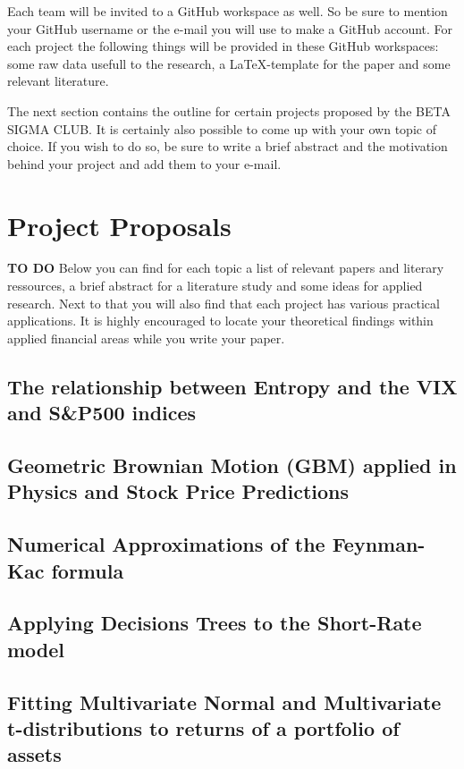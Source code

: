 \documentclass[11pt]{article}
\begin{document}
Each team will be invited to a GitHub workspace as well. So be sure to mention your GitHub username or the e-mail you will use to make a GitHub account. For each project the following things will be provided in these GitHub workspaces: some raw data usefull to the research, a \LaTeX-template for the paper and some relevant literature.

The next section contains the outline for certain projects proposed by the BETA SIGMA CLUB. It is certainly also possible to come up with your own topic of choice. If you wish to do so, be sure to write a brief abstract and the motivation behind your project and add them to your e-mail.

\section{Project Proposals}
\textbf{TO DO} Below you can find for each topic a list of relevant papers and literary ressources, a brief abstract for a literature study and some ideas for applied research. Next to that you will also find that each project has various practical applications. It is highly encouraged to locate your theoretical findings within applied financial areas while you write your paper.


\subsection{The relationship between Entropy and the VIX and S\&P500 indices}

\subsection{Geometric Brownian Motion (GBM) applied in Physics and Stock Price Predictions}

\subsection{Numerical Approximations of the Feynman-Kac formula}

\subsection{Applying Decisions Trees to the Short-Rate model}

\subsection{Fitting Multivariate Normal and Multivariate t-distributions to returns of a portfolio of assets}
\end{document}
